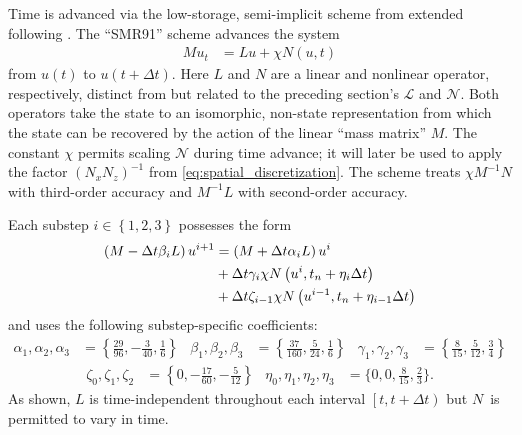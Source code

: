 Time is advanced via the low-storage, semi-implicit scheme from
\citet*[Appendix A]{spalart_lowstoragerk} extended following
\citet{ShanYang2011}.  The ``SMR91'' scheme advances the system
\begin{align}
\label{eq:timediscretization}
 M u_t &= Lu + \chi{} N(u,t)
\end{align}
from $u\left(t\right)$ to $u\left( t+\Delta{}t \right)$.  Here $L$ and $N$ are a linear
and nonlinear operator, respectively, distinct from but related to the
preceding section's $\mathscr{L}$ and $\mathscr{N}$.  Both operators take the state
to an isomorphic, non-state representation from which the state can be recovered by
the action of the linear ``mass matrix'' $M$.
%
The constant $\chi$ permits scaling $\mathscr{N}$ during time advance; it will later
be used to apply the factor $\left(N_x N_z\right)^{-1}$ from
\eqref{eq:spatial_discretization}.
%
The scheme treats
$\chi{}M^{-1}N$ with third-order accuracy and $M^{-1}L$ with second-order
accuracy.

Each substep $i\in\left\{ 1,2,3 \right\}$ possesses the form
\begin{align}
  \left(M - \Delta{}t\beta_{i}{L}\right) u^{i+1}
  &=
  \left(M + \Delta{}t\alpha_{i}{L}\right) u^{i}
\notag\\
 &+ \Delta{}t\gamma_{i}\chi{}
    {N}\left(u^{i}, t_{n}+\eta_{i}\Delta{}t\right)
\notag\\
 &+ \Delta{}t\zeta_{i-1}\chi{}
    {N}\left(u^{i-1}, t_{n}+\eta_{i-1}\Delta{}t\right)
  \label{eq:generaloperatormasssubstep}
\end{align}
and uses the following substep-specific coefficients:
\begin{align*}
  \alpha_1, \alpha_2, \alpha_3 &= \left\{
    \frac{29}{96}, -\frac{3}{40},  \frac{1}{6}
  \right\}
  &
  \beta_1, \beta_2, \beta_3 &= \left\{
    \frac{37}{160}, \frac{5}{24}, \frac{1}{6}
  \right\}
  &
  \gamma_1, \gamma_2, \gamma_3 &= \left\{
    \frac{8}{15}, \frac{5}{12}, \frac{3}{4}
  \right\}
\end{align*}
\begin{align*}
  \zeta_0, \zeta_1, \zeta_2 &= \left\{
    0, -\frac{17}{60}, -\frac{5}{12}
  \right\}
  &
  \eta_0, \eta_1, \eta_2, \eta_3 &= \Biggl\{
    0, 0, \frac{8}{15}, \frac{2}{3}
  \Biggr\}.
\end{align*}
As shown, $L$ is time-independent throughout each interval $\left[t,
t+\Delta{}t\right)$ but $N$~is permitted to vary in time.

